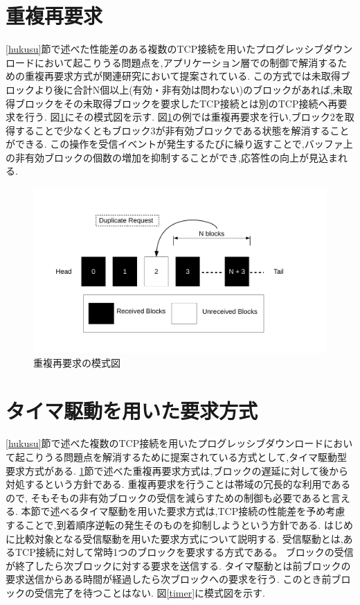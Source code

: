 \documentclass[a4j,12pt]{gradthesis_utf8}
\begin{document}
 \section{重複再要求}
 \label{juhuku}
 \ref{hukusu}節で述べた性能差のある複数のTCP接続を用いたプログレッシブダウンロードにおいて起こりうる問題点を,アプリケーション層での制御で解消するための重複再要求方式が関連研究\cite{proxy}において提案されている.
 この方式では未取得ブロックより後に合計N個以上(有効・非有効は問わない)のブロックがあれば,未取得ブロックをその未取得ブロックを要求したTCP接続とは別のTCP接続へ再要求を行う.
 図\ref{blockdup}にその模式図を示す.
 図\ref{blockdup}の例では重複再要求を行い,ブロック2を取得することで少なくともブロック3が非有効ブロックである状態を解消することができる.
 この操作を受信イベントが発生するたびに繰り返すことで,バッファ上の非有効ブロックの個数の増加を抑制することができ,応答性の向上が見込まれる.
 
 \begin{figure}[ht]
     \centering
     \includegraphics[width=18.5cm]{figure/block_dup.pdf}
     \caption{重複再要求の模式図}
     \label{blockdup}
 \end{figure}

\newpage
 
\section{タイマ駆動を用いた要求方式}
\ref{hukusu}節で述べた複数のTCP接続を用いたプログレッシブダウンロードにおいて起こりうる問題点を解消するために提案されている方式として,タイマ駆動型要求方式がある\cite{horiba}.
\ref{juhuku}節で述べた重複再要求方式は,ブロックの遅延に対して後から対処するという方針である.
重複再要求を行うことは帯域の冗長的な利用であるので,
そもそもの非有効ブロックの受信を減らすための制御も必要であると言える.
本節で述べるタイマ駆動を用いた要求方式は,TCP接続の性能差を予め考慮することで,到着順序逆転の発生そのものを抑制しようという方針である.
はじめに比較対象となる受信駆動を用いた要求方式について説明する.
受信駆動とは,あるTCP接続に対して常時1つのブロックを要求する方式である。
ブロックの受信が終了したら次ブロックに対する要求を送信する.
タイマ駆動とは前ブロックの要求送信からある時間が経過したら次ブロックへの要求を行う.
このとき前ブロックの受信完了を待つことはない.
図\ref{timer}に模式図を示す.
\end{document}
